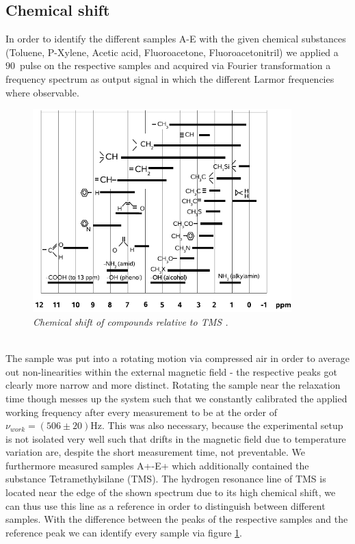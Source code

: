 \subsection{Chemical shift}
In order to identify the different samples A-E with the given chemical substances (Toluene, P-Xylene, Acetic acid, Fluoroacetone, Fluoroacetonitril) we applied a $90$\textdegree\, pulse on the respective samples and acquired via Fourier transformation a frequency spectrum as output signal in which the different Larmor frequencies where observable.
\begin{figure}[h]
	\includegraphics[width=100mm]{Calibration}
	\centering
	\caption{\itshape Chemical shift of compounds relative to TMS \cite{manual}.}
	\label{fig:5}
\end{figure}
\noindent
\\
The sample was put into a rotating motion via compressed air in order to average out non-linearities within the external magnetic field - the respective peaks got clearly more narrow and more distinct. Rotating the sample near the relaxation time though messes up the system such that we constantly calibrated the applied working frequency after every measurement to be at the order of $\nu _{work} = (506 \pm 20) \mathrm{Hz}$. This was also necessary, because the experimental setup is not isolated very well such that drifts in the magnetic field due to temperature variation are, despite the short measurement time, not preventable.
 We furthermore measured samples A+-E+ which additionally contained the substance Tetramethylsilane (TMS). The hydrogen resonance line of TMS is located near the edge of the shown spectrum due to its high chemical shift, we can thus use this line as a reference in order to distinguish between different samples. With the difference between the peaks of the respective samples and the reference peak we can identify every sample via figure \ref{fig:5}.

